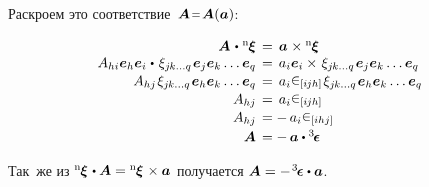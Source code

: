 \begin{otherlanguage}{russian}
Раскроем это соответствие~${\bm{A} \narroweq \bm{A}(\bm{a})}$:

\nopagebreak\vspace{-0.1em}\begin{equation*}
\begin{array}{r@{\hspace{1ex}}c@{\hspace{1ex}}l}
\bm{A} \hspace{.2ex}\dotp\hspace{.1ex} {^\mathrm{n}\hspace{-0.12ex}\bm{\xi}} & = & \bm{a} \hspace{.1ex} \times {^\mathrm{n}\hspace{-0.12ex}\bm{\xi}}
\\
%
A_{hi} \bm{e}_h \bm{e}_i \hspace{.1ex}\dotp\hspace{.25ex} \xi_{j\hspace{-0.1ex}k \ldots q} \hspace{.2ex} \bm{e}_j \bm{e}_k \ldots \bm{e}_q & = & a_{i} \bm{e}_i \times\hspace{.2ex} \xi_{j\hspace{-0.1ex}k \ldots q} \hspace{.2ex} \bm{e}_j \bm{e}_k \ldots \bm{e}_q
\\[.1em]
%
A_{hj} \hspace{.2ex} \xi_{j\hspace{-0.1ex}k \ldots q} \hspace{.2ex} \bm{e}_h \bm{e}_k \ldots \bm{e}_q & = & a_{i} \permutationsparitysymbols{i\hspace{-0.1ex}jh} \hspace{.2ex} \xi_{j\hspace{-0.1ex}k \ldots q} \hspace{.2ex} \bm{e}_h \bm{e}_k \ldots \bm{e}_q
\\[.1em]
%
A_{hj} & = & a_{i} \permutationsparitysymbols{i\hspace{-0.1ex}jh}
\\[.1em]
%
A_{hj} & = & \! - \, a_{i} \permutationsparitysymbols{ihj}
\\[.2em]
%
\bm{A} & = & \! - \, \bm{a} \dotp \permutationsparitytensor
\end{array}
\end{equation*}

Так~же из ${{^\mathrm{n}\hspace{-0.12ex}\bm{\xi}} \hspace{.2ex} \dotp \bm{A} = {^\mathrm{n}\hspace{-0.12ex}\bm{\xi}} \hspace{.2ex}\times \bm{a}}$ получается ${\bm{A} = - \hspace{.2ex} \permutationsparitytensor \dotp \bm{a}}$.


\end{otherlanguage}
